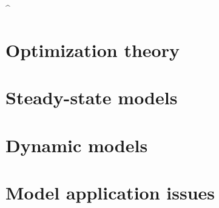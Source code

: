 %
    ^\section{Optimization theory}
        

    \section{Steady-state models}
        

    \section{Dynamic models}
        

    \section{Model application issues}
        
